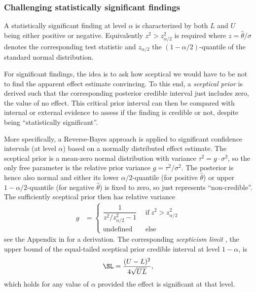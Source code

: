 \subsubsection{Challenging statistically significant findings}
\label{sec4:significantFindings}

A statistically significant finding at level $\alpha$ is characterized by both
$L$ and $U$ being either positive or negative. Equivalently
$z^2 > z_{\alpha/2}^2$ is required where $z=\hat \theta/\sigma$ denotes the
corresponding test statistic and $z_{\alpha/2}$ the $(1-\alpha/2)$-quantile of
the standard normal distribution.

For significant findings, the idea is to ask how sceptical we would have to be
not to find the apparent effect estimate convincing. To this end, a
\emph{sceptical prior} is derived such that the corresponding posterior credible
interval just includes zero, the value of no effect. This critical prior
interval can then be compared with internal or external evidence to assess if
the finding is credible or not, despite being ``statistically significant''.


More specifically, a Reverse-Bayes approach is applied to significant confidence
intervals (at level $\alpha$) based on a normally distributed effect estimate.
The sceptical prior is a mean-zero normal distribution with variance
$\tau^2 = g \cdot \sigma^2$, so the only free parameter is the relative prior
variance $g = \tau^2/\sigma^2$. The posterior is hence also normal and either
its lower $\alpha/2$-quantile (for positive $\hat{\theta}$) or upper
$1 - \alpha/2$-quantile (for negative $\hat{\theta}$) is fixed to zero, so just
represents ``non-credible''. The sufficiently sceptical prior then has relative
variance
\begin{align}
  \label{eq4:sspv}
  g &=
      \begin{cases}
        \dfrac{1}{z^2/z_{\alpha/2}^2 - 1}
        & ~~ \text{if} ~
        {z^2} > {z_{\alpha/2}^2} \\
        \text{undefined} & ~~ \text{else}
      \end{cases}
\end{align}
see the Appendix in \citet{Held2019a} for a derivation. The corresponding
\emph{scepticism limit} \citep{Matthews2018}, the upper bound of the
equal-tailed sceptical prior credible interval at level $1-\alpha$, is
\begin{equation}
  \label{eq4:S}
  \SL = \frac{(U-L)^2}{4 \sqrt{UL}},
\end{equation}
which holds for any value of $\alpha$ provided the effect is significant at that
level.


